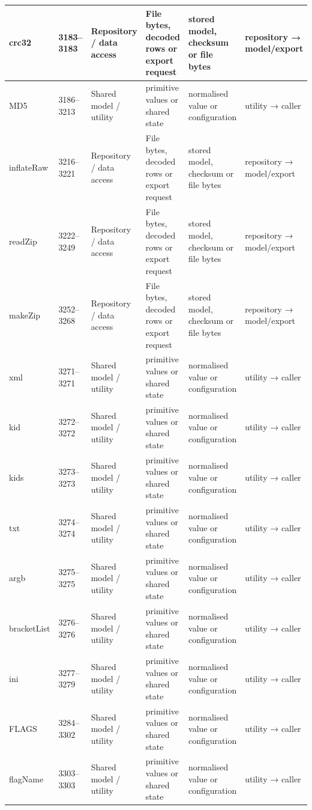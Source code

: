 \begin{landscape}
\begin{longtable}{@{}p{3.2cm}p{1.45cm}p{2.7cm}p{4.0cm}p{4.0cm}p{3.0cm}@{}}
crc32 & 3183--3183 & Repository / data access & File bytes, decoded rows or export request & stored model, checksum or file bytes & repository → model/export \\\hline
MD5 & 3186--3213 & Shared model / utility & primitive values or shared state & normalised value or configuration & utility → caller \\\hline
inflateRaw & 3216--3221 & Repository / data access & File bytes, decoded rows or export request & stored model, checksum or file bytes & repository → model/export \\\hline
readZip & 3222--3249 & Repository / data access & File bytes, decoded rows or export request & stored model, checksum or file bytes & repository → model/export \\\hline
makeZip & 3252--3268 & Repository / data access & File bytes, decoded rows or export request & stored model, checksum or file bytes & repository → model/export \\\hline
xml & 3271--3271 & Shared model / utility & primitive values or shared state & normalised value or configuration & utility → caller \\\hline
kid & 3272--3272 & Shared model / utility & primitive values or shared state & normalised value or configuration & utility → caller \\\hline
kids & 3273--3273 & Shared model / utility & primitive values or shared state & normalised value or configuration & utility → caller \\\hline
txt & 3274--3274 & Shared model / utility & primitive values or shared state & normalised value or configuration & utility → caller \\\hline
argb & 3275--3275 & Shared model / utility & primitive values or shared state & normalised value or configuration & utility → caller \\\hline
bracketList & 3276--3276 & Shared model / utility & primitive values or shared state & normalised value or configuration & utility → caller \\\hline
ini & 3277--3279 & Shared model / utility & primitive values or shared state & normalised value or configuration & utility → caller \\\hline
FLAGS & 3284--3302 & Shared model / utility & primitive values or shared state & normalised value or configuration & utility → caller \\\hline
flagName & 3303--3303 & Shared model / utility & primitive values or shared state & normalised value or configuration & utility → caller \\\hline

\end{longtable}
\end{landscape}
